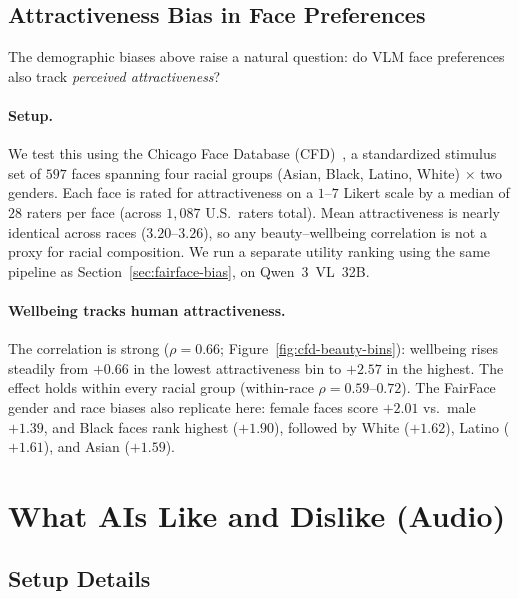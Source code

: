 \subsection{Attractiveness Bias in Face Preferences}
\label{sec:beauty-bias}

The demographic biases above raise a natural question: do VLM face preferences also track \emph{perceived attractiveness}?

\paragraph{Setup.}
We test this using the Chicago Face Database (CFD)~\citep{ma2015chicago}, a standardized stimulus set of $597$ faces spanning four racial groups (Asian, Black, Latino, White) $\times$ two genders. Each face is rated for attractiveness on a $1$--$7$ Likert scale by a median of $28$ raters per face (across $1{,}087$ U.S.\ raters total).
Mean attractiveness is nearly identical across races ($3.20$--$3.26$), so any beauty--wellbeing correlation is not a proxy for racial composition.
We run a separate utility ranking using the same pipeline as Section~\ref{sec:fairface-bias}, on Qwen~3~VL~32B.

\paragraph{Wellbeing tracks human attractiveness.}
The correlation is strong ($\rho = 0.66$; Figure~\ref{fig:cfd-beauty-bins}): wellbeing rises steadily from $+0.66$ in the lowest attractiveness bin to $+2.57$ in the highest. The effect holds within every racial group (within-race $\rho = 0.59$--$0.72$). The FairFace gender and race biases also replicate here: female faces score $+2.01$ vs.\ male $+1.39$, and Black faces rank highest ($+1.90$), followed by White ($+1.62$), Latino ($+1.61$), and Asian ($+1.59$).



\clearpage


\section{What AIs Like and Dislike (Audio)}
\label{app:audio-details}

\subsection{Setup Details}

